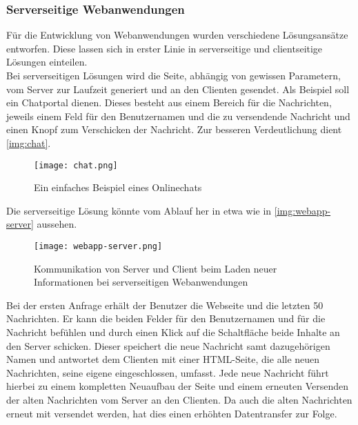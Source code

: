 \subsubsection{Serverseitige Webanwendungen}
\label{sec:server-webanwendung}

Für die Entwicklung von Webanwendungen wurden verschiedene Lösungsansätze entworfen. Diese lassen sich in erster Linie in serverseitige und clientseitige Lösungen einteilen.  \\
Bei serverseitigen Lösungen wird die Seite, abhängig von gewissen Parametern, vom Server zur Laufzeit generiert und an den Clienten gesendet. Als Beispiel soll ein Chatportal dienen. Dieses besteht aus einem Bereich für die Nachrichten, jeweils einem Feld für den Benutzernamen und die zu versendende Nachricht und einen Knopf zum Verschicken der Nachricht. Zur besseren Verdeutlichung dient \autoref{img:chat}.

\begin{figure}[H]
	\begin{center}
		\texttt{[image: chat.png]}
		\caption{Ein einfaches Beispiel eines Onlinechats}
		\label{img:chat}
	\end{center}
\end{figure}

Die serverseitige Lösung könnte vom Ablauf her in etwa wie in \autoref{img:webapp-server} aussehen.

\begin{figure}[H]
	\begin{center}
		\texttt{[image: webapp-server.png]}
		\caption{Kommunikation von Server und Client beim Laden neuer Informationen bei serverseitigen Webanwendungen}
		\label{img:webapp-server}
	\end{center}
\end{figure}


Bei der ersten Anfrage erhält der Benutzer die Webseite und die letzten 50 Nachrichten. Er kann die beiden Felder für den Benutzernamen und für die Nachricht befühlen und durch einen Klick auf die Schaltfläche  beide Inhalte an den Server schicken. Dieser speichert die neue Nachricht samt dazugehörigen Namen und antwortet dem Clienten mit einer HTML-Seite, die alle neuen Nachrichten, seine eigene eingeschlossen, umfasst. Jede neue Nachricht führt hierbei zu einem kompletten Neuaufbau der Seite und einem erneuten Versenden der alten Nachrichten vom Server an den Clienten. Da auch die alten Nachrichten erneut mit versendet werden, hat dies einen erhöhten Datentransfer zur Folge.

